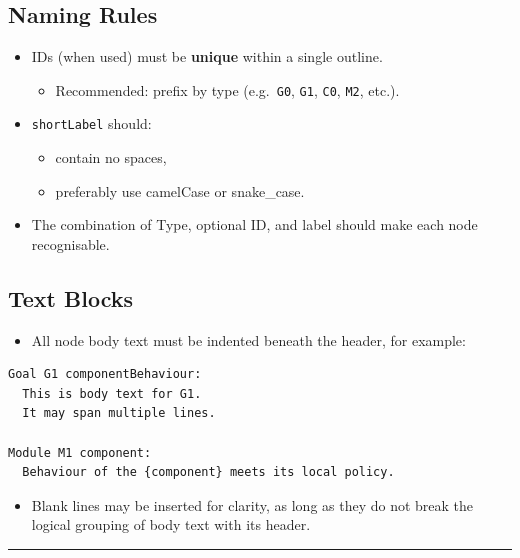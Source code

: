\documentclass[11pt]{article}
\begin{document}
\subsection{Naming Rules}

\begin{itemize}[leftmargin=2em]
  \item IDs (when used) must be \textbf{unique} within a single outline.
  \begin{itemize}[leftmargin=1.5em]
    \item Recommended: prefix by type (e.g.\ \texttt{G0}, \texttt{G1}, \texttt{C0}, \texttt{M2}, etc.).
  \end{itemize}

  \item \texttt{shortLabel} should:
  \begin{itemize}[leftmargin=1.5em]
    \item contain no spaces,
    \item preferably use camelCase or snake\_case.
  \end{itemize}

  \item The combination of Type, optional ID, and label should make each node recognisable.
\end{itemize}

\subsection{Text Blocks}

\begin{itemize}[leftmargin=2em]
  \item All node body text must be indented beneath the header, for example:
\end{itemize}

\begin{verbatim}
Goal G1 componentBehaviour:
  This is body text for G1.
  It may span multiple lines.

Module M1 component:
  Behaviour of the {component} meets its local policy.
\end{verbatim}

\begin{itemize}[leftmargin=2em]
  \item Blank lines may be inserted for clarity, as long as they do not break the logical grouping of body text with its header.
\end{itemize}

\bigskip
\hrule
\bigskip
\end{document}
